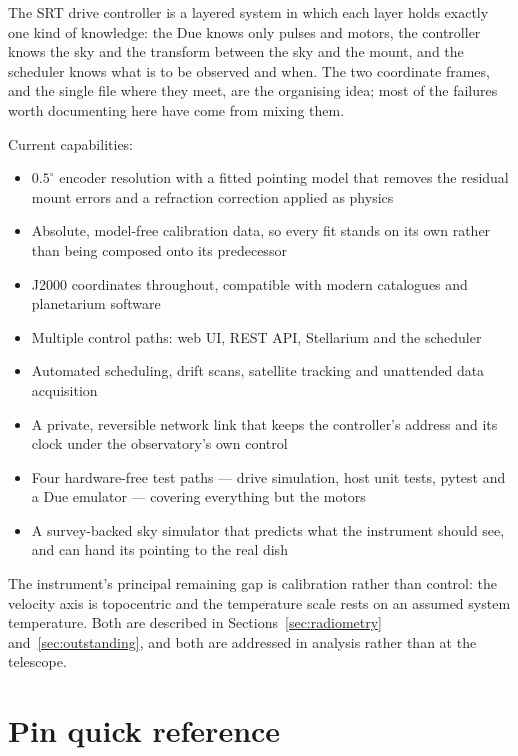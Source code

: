 \documentclass[11pt,a4paper]{article}
\begin{document}
The SRT drive controller is a layered system in which each layer holds exactly one kind of knowledge: the Due knows only pulses and motors, the controller knows the sky and the transform between the sky and the mount, and the scheduler knows what is to be observed and when. The two coordinate frames, and the single file where they meet, are the organising idea; most of the failures worth documenting here have come from mixing them.

Current capabilities:

\begin{itemize}
    \item $0.5^\circ$ encoder resolution with a fitted pointing model that removes the residual mount errors and a refraction correction applied as physics
    \item Absolute, model-free calibration data, so every fit stands on its own rather than being composed onto its predecessor
    \item J2000 coordinates throughout, compatible with modern catalogues and planetarium software
    \item Multiple control paths: web UI, REST API, Stellarium and the scheduler
    \item Automated scheduling, drift scans, satellite tracking and unattended data acquisition
    \item A private, reversible network link that keeps the controller's address and its clock under the observatory's own control
    \item Four hardware-free test paths --- drive simulation, host unit tests, pytest and a Due emulator --- covering everything but the motors
    \item A survey-backed sky simulator that predicts what the instrument should see, and can hand its pointing to the real dish
\end{itemize}

The instrument's principal remaining gap is calibration rather than control: the velocity axis is topocentric and the temperature scale rests on an assumed system temperature. Both are described in Sections~\ref{sec:radiometry} and~\ref{sec:outstanding}, and both are addressed in analysis rather than at the telescope.

\appendix
\section{Pin quick reference}
\end{document}
